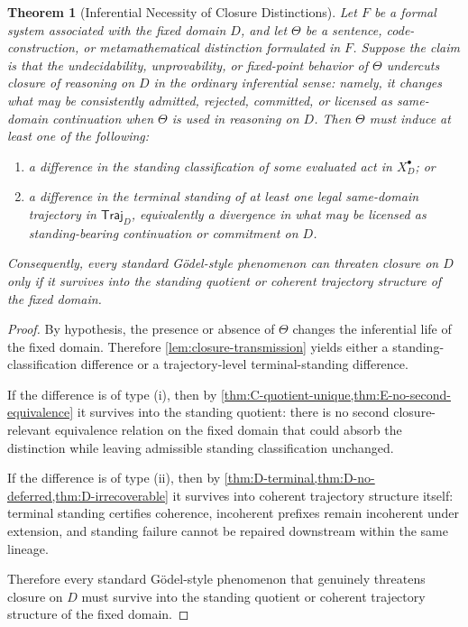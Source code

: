 \documentclass[11pt]{article}
\theoremstyle{plain}
\newtheorem{theorem}{Theorem}[section]
\theoremstyle{definition}
\newcommand{\Eval}{X_D^{\bullet}}
\newcommand{\domain}{D}
\newcommand{\Traj}{\mathsf{Traj}_D}
\begin{document}
\begin{theorem}[Inferential Necessity of Closure Distinctions]
\label{thm:inferential-necessity}
Let $F$ be a formal system associated with the fixed domain $\domain$, and let $\Theta$ be a sentence, code-construction, or metamathematical distinction formulated in $F$. Suppose the claim is that the undecidability, unprovability, or fixed-point behavior of $\Theta$ undercuts closure of reasoning on $\domain$ in the ordinary inferential sense: namely, it changes what may be consistently admitted, rejected, committed, or licensed as same-domain continuation when $\Theta$ is used in reasoning on $\domain$. Then $\Theta$ must induce at least one of the following:
\begin{enumerate}[label=(\roman*), leftmargin=2.5em]
    \item a difference in the standing classification of some evaluated act in $\Eval$; or
    \item a difference in the terminal standing of at least one legal same-domain trajectory in $\Traj$, equivalently a divergence in what may be licensed as standing-bearing continuation or commitment on $\domain$.
\end{enumerate}
Consequently, every standard G\"odel-style phenomenon can threaten closure on $\domain$ only if it survives into the standing quotient or coherent trajectory structure of the fixed domain.
\end{theorem}

\begin{proof}
By hypothesis, the presence or absence of $\Theta$ changes the inferential life of the fixed domain. Therefore \cref{lem:closure-transmission} yields either a standing-classification difference or a trajectory-level terminal-standing difference.

If the difference is of type (i), then by \cref{thm:C-quotient-unique,thm:E-no-second-equivalence} it survives into the standing quotient: there is no second closure-relevant equivalence relation on the fixed domain that could absorb the distinction while leaving admissible standing classification unchanged.

If the difference is of type (ii), then by \cref{thm:D-terminal,thm:D-no-deferred,thm:D-irrecoverable} it survives into coherent trajectory structure itself: terminal standing certifies coherence, incoherent prefixes remain incoherent under extension, and standing failure cannot be repaired downstream within the same lineage.

Therefore every standard G\"odel-style phenomenon that genuinely threatens closure on $\domain$ must survive into the standing quotient or coherent trajectory structure of the fixed domain.
\end{proof}
\end{document}
